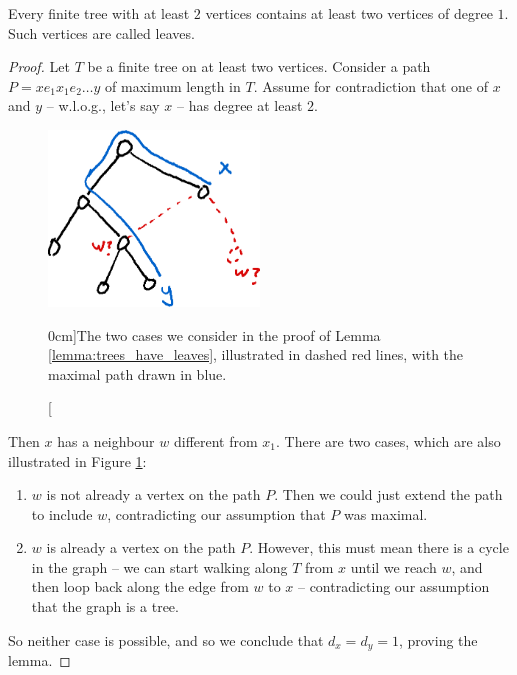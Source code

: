\documentclass[nobib]{tufte-handout}
\begin{document}
\begin{lemma}\label{lemma:trees_have_leaves}
  Every finite tree with at least $2$ vertices contains at least two vertices of degree $1$. Such vertices are called leaves.

  \begin{proof}
    Let $T$ be a finite tree on at least two vertices. Consider a path $P = x e_1 x_1 e_2 \ldots y$ of maximum length in $T$. Assume for contradiction that one of $x$ and $y$ -- w.l.o.g., let's say $x$ -- has degree at least $2$.

    \begin{figure}
      \centering
      \includegraphics[width=0.5\textwidth]{graphics/L3_trees/lemma_trees_have_leaves.png}
      \caption[][0cm]{The two cases we consider in the proof of Lemma \ref{lemma:trees_have_leaves}, illustrated in dashed red lines, with the maximal path drawn in blue.}
      \label{fig:lemma_trees_have_leaves}
    \end{figure}

    Then $x$ has a neighbour $w$ different from $x_1$. There are two cases, which are also illustrated in Figure \ref{fig:lemma_trees_have_leaves}:
    \begin{enumerate}
      \item $w$ is not already a vertex on the path $P$. Then we could just extend the path to include $w$, contradicting our assumption that $P$ was maximal.
      \item $w$ is already a vertex on the path $P$. However, this must mean there is a cycle in the graph -- we can start walking along $T$ from $x$ until we reach $w$, and then loop back along the edge from $w$ to $x$ -- contradicting our assumption that the graph is a tree.
    \end{enumerate}

    So neither case is possible, and so we conclude that $d_x = d_y = 1$, proving the lemma.
  \end{proof}
\end{lemma}
\end{document}
